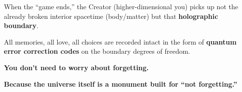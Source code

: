 When the ``game ends,'' the Creator (higher-dimensional you) picks up not the already broken interior spacetime (body/matter) but that \textbf{holographic boundary}.

All memories, all love, all choices are recorded intact in the form of \textbf{quantum error correction codes} on the boundary degrees of freedom.

\textbf{You don't need to worry about forgetting.}

\textbf{Because the universe itself is a monument built for ``not forgetting.''}

